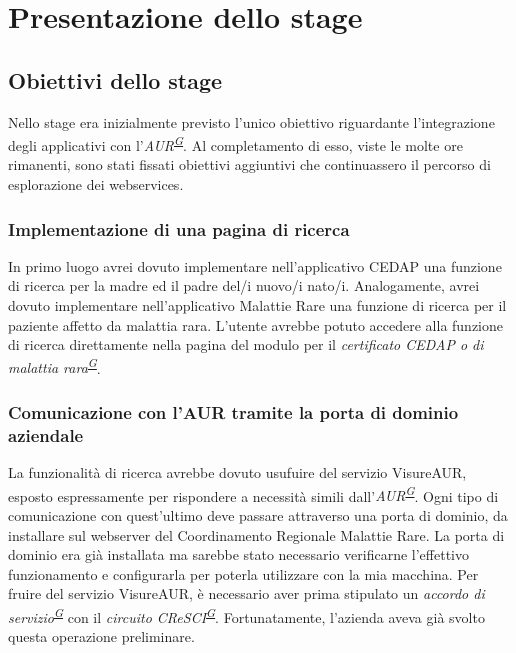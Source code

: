 \documentclass[a4paper]{article}
\newcommand{\crmr}{Coordinamento Regionale Malattie Rare}
\begin{document}
\newpage

\section{Presentazione dello stage}

\subsection{Obiettivi dello stage}
Nello stage era inizialmente previsto l'unico obiettivo riguardante l'integrazione degli applicativi con l'\textit{AUR\textsuperscript{\hyperref[sec:gl]{G}}}. Al completamento di esso, viste le molte ore rimanenti, sono stati fissati obiettivi aggiuntivi che continuassero il percorso di esplorazione dei webservices.

\subsubsection{Implementazione di una pagina di ricerca}
In primo luogo avrei dovuto implementare nell'applicativo CEDAP una funzione di ricerca per la madre ed il padre del/i nuovo/i nato/i. Analogamente, avrei dovuto implementare nell'applicativo Malattie Rare una funzione di ricerca per il paziente affetto da malattia rara. L'utente avrebbe potuto accedere alla funzione di ricerca direttamente nella pagina del modulo per il \textit{certificato CEDAP o di malattia rara\textsuperscript{\hyperref[sec:gl]{G}}}.

\subsubsection{Comunicazione con l'AUR tramite la porta di dominio aziendale}
La funzionalità di ricerca avrebbe dovuto usufuire del servizio VisureAUR, esposto espressamente per rispondere a necessità simili dall'\textit{AUR\textsuperscript{\hyperref[sec:gl]{G}}}. Ogni tipo di comunicazione con quest'ultimo deve passare attraverso una porta di dominio, da installare sul webserver del \crmr. La porta di dominio era già installata ma sarebbe stato necessario verificarne l'effettivo funzionamento e configurarla per poterla utilizzare con la mia macchina. Per fruire del servizio VisureAUR, è necessario aver prima stipulato un \textit{accordo di servizio\textsuperscript{\hyperref[sec:gl]{G}}} con il \textit{circuito CReSCI\textsuperscript{\hyperref[sec:gl]{G}}}. Fortunatamente, l'azienda aveva già svolto questa operazione preliminare.
\end{document}
